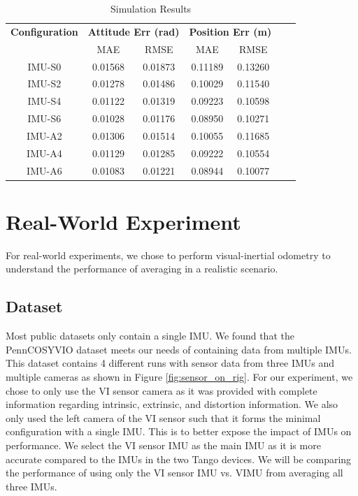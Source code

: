 \documentclass[conference]{IEEEtran}
\begin{document}
\begin{table}[h!]
\centering
\caption{Simulation Results}
\label{tab:sim_result}
\begin{tabular}{ccccccc}
\toprule
\textbf{Configuration} & \multicolumn{2}{c}{\textbf{Attitude Err (rad)}} & \multicolumn{2}{c}{\textbf{Position Err (m)}} \\
\cmidrule(lr){2-3} \cmidrule(lr){4-5}
& MAE & RMSE & MAE & RMSE \\
\midrule
IMU-S0 & 0.01568 & 0.01873 & 0.11189 & 0.13260 \\
\midrule
IMU-S2 & 0.01278 & 0.01486 & 0.10029 & 0.11540 \\
IMU-S4 & 0.01122 & 0.01319 & 0.09223 & 0.10598 \\
IMU-S6 & 0.01028 & 0.01176 & 0.08950  & 0.10271 \\
\midrule
IMU-A2 & 0.01306 & 0.01514 & 0.10055 & 0.11685 \\
IMU-A4 & 0.01129 & 0.01285 & 0.09222 & 0.10554 \\
IMU-A6 & 0.01083 & 0.01221 & 0.08944 & 0.10077 \\
\bottomrule
\end{tabular}
\end{table}

\section{Real-World Experiment}\label{real_experiment}

For real-world experiments, we chose to perform visual-inertial odometry to understand the performance of averaging in a realistic scenario.

\subsection{Dataset}

Most public datasets only contain a single IMU. We found that the PennCOSYVIO dataset \cite{penncosyvio} meets our needs of containing data from multiple IMUs. This dataset contains 4 different runs with sensor data from three IMUs and multiple cameras as shown in Figure \ref{fig:sensor_on_rig}. For our experiment, we chose to only use the VI sensor camera as it was provided with complete information regarding intrinsic, extrinsic, and distortion information. We also only used the left camera of the VI sensor such that it forms the minimal configuration with a single IMU. This is to better expose the impact of IMUs on performance. We select the VI sensor IMU as the main IMU as it is more accurate compared to the IMUs in the two Tango devices. We will be comparing the performance of using only the VI sensor IMU vs. VIMU from averaging all three IMUs.
\end{document}
